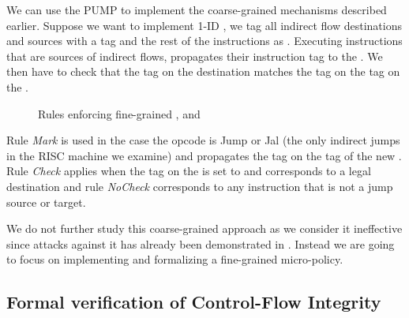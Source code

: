 
We can use the PUMP to implement the coarse-grained \CFI mechanisms described
earlier. Suppose we want to implement 1-ID \CFI, we tag all indirect flow 
destinations and sources with a tag \MARK{} and the rest of the instructions as 
\UNMARK. Executing instructions that are sources of indirect flows, propagates
their instruction tag to the \pc. We then have to check that the tag on the
destination matches the tag on the tag on the \pc.

\begin{figure}[H]
\bigskip

\bigskip

\caption{Rules enforcing fine-grained \CFI, \NXD and \NWC}
\end{figure}

Rule \emph{Mark} is used in the case the opcode is Jump or Jal (the
only indirect jumps in the RISC machine we examine) and propagates the
\MARKname tag on the tag of the new \pc. Rule \emph{Check} applies
when the tag on the \pc is set to \MARKname and corresponds to a legal
destination and rule \emph{NoCheck} corresponds to any instruction
that is not a jump source or target.

We do not further study this coarse-grained approach as we consider it
ineffective since attacks against it has already been demonstrated in
\cite{outofcontrol_ieeesp2014}. Instead we are going to focus on
implementing and formalizing a fine-grained \CFI micro-policy.


\subsection{Formal verification of Control-Flow Integrity}\label{sec:cfi_verif}

